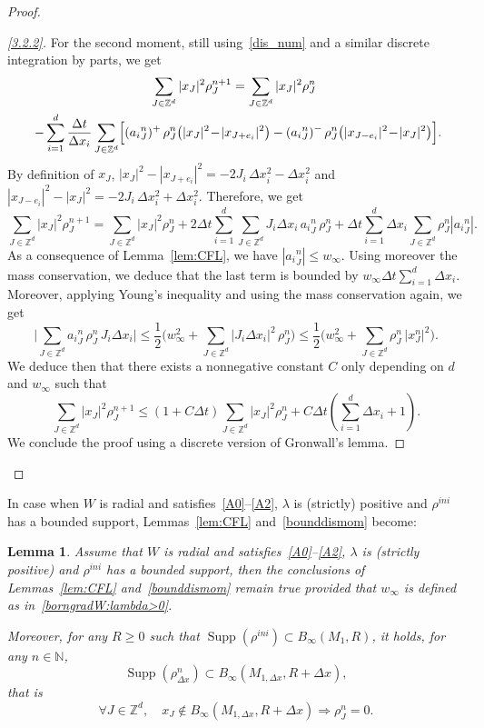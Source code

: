 \documentclass[11pt]{article}
\newtheorem{lemm}[theo]{Lemma}
\theoremstyle{definition}
\numberwithin{equation}{section}
\DeclareMathOperator{\Supp}{Supp}
\newcommand*\NN{\mathbb{N}}
\newcommand*\ZZ{\mathbb{Z}}
\newcommand*\mIn{M_{1,\Delta x}}
\newenvironment{laststep}[1]{\begin{proof}[#1]}{\end{proof}}
\let\oldforall\forall
\renewcommand*{\forall}{\mathrel{\oldforall}}
\begin{document}
\begin{proof}
\begin{laststep}{\eqref{3.2.2}}
For the second moment, still using~\eqref{dis_num} and a similar discrete integration by parts, we get
\begin{multline*}
\!\!\sum_{J\in \ZZ^d} |x_J|^2 \rho_{J}^{n+1} =  \sum_{J\in
\ZZ^d} |x_J|^2\rho_{J}^n\\ 
-  \sum_{i=1}^d \frac{\Delta t}{\Delta x_i} \sum_{J\in\ZZ^d} \Bigl[({a_i}^n_{J})^+ \, \rho_{J}^n \big(|x_J|^2\!-\!|x_{J+e_i}|^2\big) -({a_i}^n_{J})^- \, \rho_{J}^n \big(|x_{J-e_i}|^2\!-\!|x_{J}|^2\big)\Bigr].\!\!
\end{multline*}
By definition of $x_J$, $|x_J|^2-|x_{J+e_i}|^2=-2J_i\, \Delta x_i^2 - \Delta x_i^2$ and $|x_{J-e_i}|^2-|x_J|^2=-2J_i\, \Delta x_i^2 + \Delta x_i^2$. Therefore, we get
\[
\sum_{J\in \ZZ^d} |x_J|^2 \rho_{J}^{n+1} = \sum_{J\in \ZZ^d} |x_J|^2 \rho_{J}^{n} + 2\Delta t \sum_{i=1}^d\sum_{J\in \ZZ^d} J_i \Delta x_i \, {a_i}^n_{J} \, \rho_{J}^n + \Delta t\sum_{i=1}^d \Delta x_i \sum_{J\in \ZZ^d} \rho_{J}^n |{a_i}^n_{J}|.
\]
As a consequence of Lemma~\ref{lem:CFL}, we have $|{a_i}^n_{J}|\leq w_\infty$. Using moreover the mass conservation, we deduce that the last term is bounded by $w_\infty \Delta t \sum_{i=1}^d \Delta x_i$. Moreover, applying Young's inequality and using the mass conservation again, we get
\[
\mathopen\bigg|\sum_{J\in \ZZ^d} {a_i}^n_{J} \, \rho_{J}^n \, J_i \Delta x_{i} \mathclose\bigg| \leq
\frac{1}{2} \bigg(w_\infty^2 + \sum_{J\in \ZZ^d} |J_{i} \Delta x_i|^2 \, \rho_{J}^n \bigg)
\leq
\frac{1}{2} \bigg(w_\infty^2 + \sum_{J\in \ZZ^d} \rho_{J}^n
\, \vert x^n_{J} \vert^2\bigg).
\]
We deduce then that there exists a nonnegative constant $C$ only depending on $d$ and $w_\infty$ such that
\[
\sum_{J\in \ZZ^d} |x_J|^2 \rho_{J}^{n+1} \leq
(1+C\Delta t)\sum_{J\in \ZZ^d} |x_J|^2 \rho_{J}^{n} + C\Delta t\left(\sum_{i=1}^d\Delta x_i+1\right).
\]
We conclude the proof using a discrete version of Gronwall's lemma.
\end{laststep}
\let\qed\relax
\end{proof}

In case when $W$ is radial and satisfies~\eqref{A0}--\eqref{A2}, $\lambda$ is (strictly) positive and $\rho^{ini}$ has a bounded support, Lemmas~\ref{lem:CFL} and~\ref{bounddismom} become:

\begin{lemm}\label{lem:CFL:lambda:>0}
Assume that $W$ is radial and satisfies~\eqref{A0}--\eqref{A2}, $\lambda$ is (strictly positive) and $\rho^{ini}$ has a bounded support, then the conclusions of Lemmas~\ref{lem:CFL} and~\ref{bounddismom} remain true provided that $w_{\infty}$ is defined as in~\eqref{borngradW:lambda>0}.

Moreover, for any $R \geq 0$ such that $\Supp(\rho^{ini}) \subset B_{\infty}(M_{1},R)$, it holds, for any $n \in \NN$,
\begin{equation*}
\Supp(\rho^n_{\Delta x}) \subset B_{\infty}(\mIn{},R+\Delta x),
\end{equation*}
that is
\begin{equation*}
\forall J \in \ZZ^d, \quad x_{J} \not \in B_{\infty}(\mIn{},R+\Delta x)
\Rightarrow \rho^n_{J} = 0.
\end{equation*}
\end{lemm}
\end{document}

